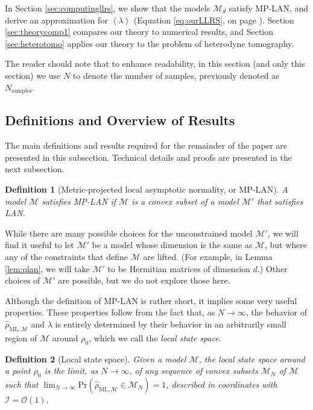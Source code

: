 \documentclass[aps,pra, twocolumn]{revtex4-1}
\newcommand{\M}{\mathcal{M}}
\newcommand{\expect}[1]{\ensuremath{\left\langle#1\right\rangle}}
\newcommand{\rhohat}{\hat{\rho}}
\newcommand{\rhoML}[1]{\rhohat_{\scriptscriptstyle{\mathrm{ML},#1}}}
\newtheorem{mydef}{Definition}
\begin{document}
In Section \ref{sec:computingllrs}, we show that the models $\M_{d}$ satisfy MP-LAN, and derive an approximation for $\expect{\lambda}$  (Equation \eqref{eq:ourLLRS}, on  page \pageref{eq:ourLLRS}).  Section \ref{sec:theorycomp1} compares our theory to numerical results, and Section \ref{sec:heterotomo} applies our theory to the problem of heterodyne tomography.


The reader should note that to enhance readability, in this section (and only this section) we use $N$ to denote the number of samples, previously denoted as $N_{\mathrm{samples}}$.

\subsection{Definitions and Overview of Results}
\label{sec:lanoverview}
The main definitions and results required for the remainder of the paper are presented in this subsection. Technical details and proofs are presented in the next subsection.

\begin{mydef}[Metric-projected local asymptotic normality, or MP-LAN]
A  model $\M$ satisfies MP-LAN if $\M$ is a convex subset of a model $\M'$ that satisfies LAN.
\end{mydef}

While there are many possible choices for the unconstrained model $\M'$, we will find it useful to let $\M'$ be a model whose dimension is the same as $\M$, but where any of the constraints that define $\M$ are lifted. (For example, in Lemma \ref{lem:qlan}, we will take $\M'$ to be Hermitian matrices of dimension $d$.) Other choices of $\M'$ are possible, but we do not explore those here.

Although the definition of MP-LAN is rather short, it implies some very useful properties. These properties follow from the fact that, as $N \rightarrow \infty$, the behavior of $\rhoML{\M}$ and $\lambda$ is entirely determined by their behavior in an arbitrarily small region of $\M$ around $\rho_{0}$, which we call the \emph{local state space}.

\begin{mydef}[Local state space]
Given a model $\M$, the local state space around a point $\rho_{0}$ is the limit, as $N \rightarrow \infty$, of any sequence of convex subsets $\M_{N}$ of $\M$ such that $\lim_{N\rightarrow \infty}\mathrm{Pr}(\rhoML{\M} \in \M_{N}) =1$, described in coordinates with $\mathcal{I} = \mathcal{O}(1)$.
\end{mydef}
\end{document}
